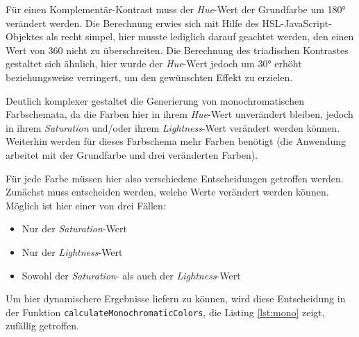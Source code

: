 
Für einen Komplementär-Kontrast muss der \textit{Hue}-Wert der Grundfarbe um 180° verändert werden. Die Berechnung erwies sich mit Hilfe des HSL-JavaScript-Objektes als recht simpel, hier musste lediglich darauf geachtet werden, den einen Wert von 360 nicht zu überschreiten.
Die Berechnung des triadischen Kontrastes gestaltet sich ähnlich, hier wurde der \textit{Hue}-Wert jedoch um 30° erhöht beziehungsweise verringert, um den gewünschten Effekt zu erzielen.

Deutlich komplexer gestaltet die Generierung von monochromatischen Farbschemata, da die Farben hier in ihrem \textit{Hue}-Wert unverändert bleiben, jedoch in ihrem \textit{Saturation} und/oder ihrem \textit{Lightness}-Wert verändert werden können. Weiterhin werden für dieses Farbschema mehr Farben benötigt (die Anwendung arbeitet mit der Grundfarbe und drei veränderten Farben).

Für jede Farbe müssen hier also verschiedene Entscheidungen getroffen werden. Zunächst muss entscheiden werden, welche Werte verändert werden können. Möglich ist hier einer von drei Fällen:

\begin{itemize}
  \item Nur der \textit{Saturation}-Wert
  \item Nur der \textit{Lightness}-Wert
  \item Sowohl der \textit{Saturation}- als auch der \textit{Lightness}-Wert
\end{itemize}

Um hier dynamischere Ergebnisse liefern zu können, wird diese Entscheidung in der Funktion \verb|calculateMonochromaticColors|, die Listing \ref{lst:mono} zeigt, zufällig getroffen.


